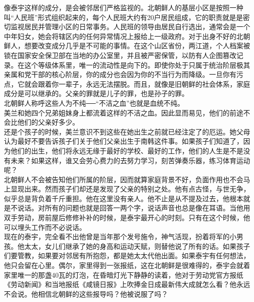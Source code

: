 像泰宇这样的成分，是会被邻居们严格监视的。北朝鲜人的基层小区是按照一种叫“人民班”形式组织起来的，每个人民班大约有20户居民组成，它的职责就是是密切监视居民并管理小区的日常事务。人民班的领导由居民自行选出，通常会是一个中年妇女，她会将辖区内的任何异常情况上报给上一级政府。对于出身不好的北朝鲜人，想要改变成分几乎是不可能的事情。在这个山区省份，两江道，个人档案被锁在国家安全保卫部在当地的办公室里，并且被严密保管，以防有人企图篡改记录。在这个等级体系里，唯一的流动性是向下的。即使你处于只属于统治阶层极其亲属和党干部的核心阶层，你的成分也会因为你的不当行为而降级。一旦你有污点，它就会跟着你一辈子，永远无法摆脱。而且，就像是旧朝鲜的社会体系，家庭成分是可以继承的。父亲的罪就是儿子的罪，也是孙子的罪。\\

北朝鲜人称呼这些人为不纯──“不洁之血”也就是血统不纯。\\

美兰和她四个兄弟姐妹身上都流着这样的不洁之血。因此显而易见，他们的前途不会比他们的父亲好多少。\\

还是个孩子的时候，美兰意识不到这些在她出生之前就已经注定了的厄运。她父母认为最好不要告诉孩子们关于他们父亲出生于南韩这件事。如果孩子们知道了，因为他们的出生，他们将永远无缘于最好的学校、最好的工作，他们的人生是不是没有未来？如果这样，谁又会劳心费力的去努力学习，刻苦弹奏乐器，练习体育运动呢？\\

北朝鲜人不会被告知他们所属的阶层，因而就算家庭背景不好，负面作用也不会马上显现出来。然而孩子们却还是发现了父亲的特别之处。他有点古怪，与世无争，似乎总是背负着千斤重担。他在这里没有亲人。他不止是从不提及过去，他根本就是不说话。对所有的问题也就是回答一两个字，说话声音也总是像在耳语。当他用双手劳动，房前屋后修修补补的时候，是泰宇最开心的时刻。只有在这个时候，他可以埋头工作而不必说话。\\

现在的泰宇，完全看不出他曾是当年那个发号施令，神气活现，扮着将军的小男孩。他太太，女儿们继承了她的身高和运动天赋，则替他说了所有的话。如果孩子们要管教，如果要对邻居有所抱怨，都是她太太代他出面。如果泰宇有任何想法，他只会留在心里。偶尔，家里得到一张报纸，这在北朝鲜是很难得的，泰宇会就着家里唯一的那盏40瓦的灯泡，在昏暗灯光下静静的读着，他对于劳动党官方报纸《劳动新闻》和当地报纸《咸镜日报》上吹捧金日成最新伟大成就怎么看？他永远不会说。他相信北朝鲜的这些报导吗？他被说服了吗？\\

